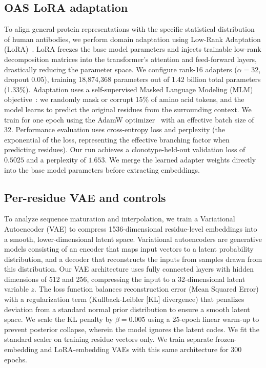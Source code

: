\subsection{OAS LoRA adaptation}

To align general-protein representations with the specific statistical
distribution of human antibodies, we perform domain adaptation using Low-Rank
Adaptation (LoRA)~\cite{hu2022lora}. LoRA freezes the base model parameters and
injects trainable low-rank decomposition matrices into the transformer's
attention and feed-forward layers, drastically reducing the parameter space. We
configure rank-16 adapters ($\alpha=32$, dropout $0.05$), training 18,874,368
parameters out of 1.42 billion total parameters (1.33\%). Adaptation uses a
self-supervised Masked Language Modeling (MLM)
objective~\cite{devlin-etal-2019-bert}: we randomly mask or corrupt 15\% of amino
acid tokens, and the model learns to predict the original residues from
the surrounding context. We train for one epoch using the AdamW
optimizer~\cite{LoshchilovH19} with an effective batch size of 32. Performance
evaluation uses cross-entropy loss and perplexity (the exponential of the
loss, representing the effective branching factor when predicting residues). Our
run achieves a clonotype-held-out validation loss of $0.5025$ and a perplexity
of $1.653$. We merge the learned adapter weights directly into the base model
parameters before extracting embeddings.

\subsection{Per-residue VAE and controls}
\label{sec:vae_methods}

To analyze sequence maturation and interpolation, we train a Variational
Autoencoder (VAE) to compress 1536-dimensional residue-level embeddings into a
smooth, lower-dimensional latent space. Variational autoencoders are generative
models consisting of an encoder that maps input vectors to a latent probability
distribution, and a decoder that reconstructs the inputs from samples drawn from
this distribution. Our VAE architecture uses fully connected layers with hidden
dimensions of 512 and 256, compressing the input to a 32-dimensional latent
variable $z$. The loss function balances reconstruction error (Mean Squared
Error) with a regularization term (Kullback-Leibler [KL] divergence) that
penalizes deviation from a standard normal prior distribution to ensure a smooth
latent space. We scale the KL penalty by $\beta=0.005$ using a 25-epoch linear
warm-up to prevent posterior collapse, wherein the model ignores the latent
codes. We fit the standard scaler on training residue vectors only.
We train separate frozen-embedding and LoRA-embedding VAEs with this same
architecture for 300 epochs.

